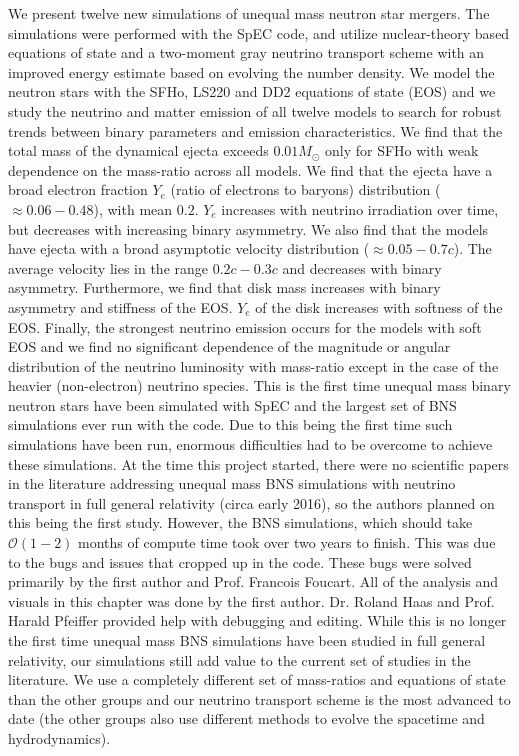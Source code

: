We present twelve new simulations of unequal mass neutron star mergers. The simulations were performed with the SpEC code, and utilize nuclear-theory based equations of state and a two-moment gray neutrino transport scheme with an improved energy estimate based on evolving the number density. We model the neutron stars with the SFHo, LS220 and DD2 equations of state (EOS) and we study the neutrino and matter emission of all twelve models to search for robust trends between binary parameters and emission characteristics. We find that the total mass of the dynamical ejecta exceeds $0.01M_\odot$ only for SFHo with weak dependence on the mass-ratio across all models.  We find that the  ejecta have a broad electron fraction $Y_e$ (ratio of electrons to baryons) distribution ($\approx 0.06-0.48$), with mean $0.2$. $Y_e$ increases with neutrino irradiation over time, but decreases with increasing binary asymmetry. We also find that the models have ejecta with a broad asymptotic velocity distribution ($\approx 0.05-0.7c$). The average velocity lies in the range $0.2c - 0.3c$ and decreases with binary asymmetry. Furthermore, we find that disk mass increases with binary asymmetry and stiffness of the EOS. $Y_e$ of the disk increases with softness of the EOS. Finally, the strongest neutrino emission occurs for the models with soft EOS and we find no significant dependence of the magnitude or angular distribution of the neutrino luminosity with mass-ratio except in the case of the heavier (non-electron) neutrino species. This is the first time unequal mass binary neutron stars have been simulated with SpEC and the largest set of BNS simulations ever run with the code. Due to this being the first time such simulations have been run, enormous difficulties had to be overcome to achieve these simulations. At the time this project started, there were no scientific papers in the literature addressing unequal mass BNS simulations with neutrino transport in full general relativity (circa early 2016), so the authors planned on this being the first study. However, the BNS simulations, which should take $\mathcal{O}(1-2)$ months of compute time took over two years to finish. This was due to the bugs and issues that cropped up in the code. These bugs were solved primarily by the first author and Prof. Francois Foucart. All of the analysis and visuals in this chapter was done by the first author. Dr. Roland Haas and Prof. Harald Pfeiffer provided help with debugging and editing. While this is no longer the first time unequal mass BNS simulations have been studied in full general relativity, our simulations still add value to the current set of studies in the literature. We use a completely different set of mass-ratios and equations of state than the other groups and our neutrino transport scheme is the most advanced to date (the other groups also use different methods to evolve the spacetime and hydrodynamics).

